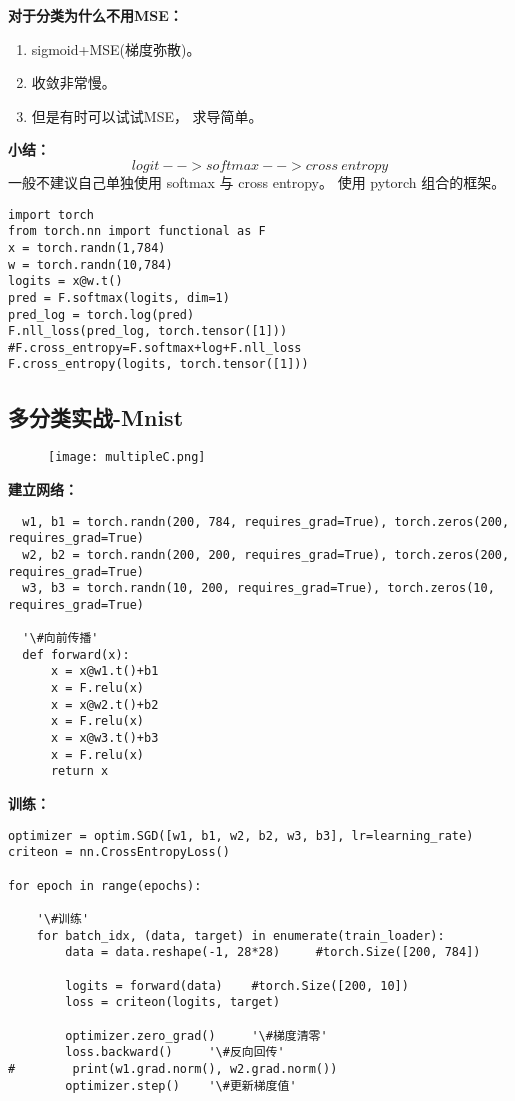 \noindent \textbf{对于分类为什么不用MSE：}
\begin{enumerate}
  \item sigmoid+MSE(梯度弥散)。
  \item 收敛非常慢。
  \item 但是有时可以试试MSE， 求导简单。
\end{enumerate}

\noindent \textbf{小结：}
$$logit-->softmax-->cross~entropy$$
\indent 一般不建议自己单独使用 softmax 与 cross entropy。 使用 pytorch 组合的框架。
\begin{lstlisting}
import torch
from torch.nn import functional as F
x = torch.randn(1,784)
w = torch.randn(10,784)
logits = x@w.t()
pred = F.softmax(logits, dim=1)
pred_log = torch.log(pred)
F.nll_loss(pred_log, torch.tensor([1]))   #F.cross_entropy=F.softmax+log+F.nll_loss
F.cross_entropy(logits, torch.tensor([1]))
\end{lstlisting}


\newpage
\subsection{多分类实战-Mnist}
\begin{figure}[!h]
  \centering
  \texttt{[image: multipleC.png]}
\end{figure}

\textbf{建立网络：}
\begin{lstlisting}
  w1, b1 = torch.randn(200, 784, requires_grad=True), torch.zeros(200, requires_grad=True)
  w2, b2 = torch.randn(200, 200, requires_grad=True), torch.zeros(200, requires_grad=True)
  w3, b3 = torch.randn(10, 200, requires_grad=True), torch.zeros(10, requires_grad=True)

  '\#向前传播'
  def forward(x):
      x = x@w1.t()+b1
      x = F.relu(x)
      x = x@w2.t()+b2
      x = F.relu(x)
      x = x@w3.t()+b3
      x = F.relu(x)
      return x
\end{lstlisting}

\textbf{训练：}
\begin{lstlisting}
optimizer = optim.SGD([w1, b1, w2, b2, w3, b3], lr=learning_rate)
criteon = nn.CrossEntropyLoss()

for epoch in range(epochs):

    '\#训练'
    for batch_idx, (data, target) in enumerate(train_loader):
        data = data.reshape(-1, 28*28)     #torch.Size([200, 784])

        logits = forward(data)    #torch.Size([200, 10])
        loss = criteon(logits, target)

        optimizer.zero_grad()     '\#梯度清零'
        loss.backward()     '\#反向回传'
#        print(w1.grad.norm(), w2.grad.norm())
        optimizer.step()    '\#更新梯度值'
\end{lstlisting}

